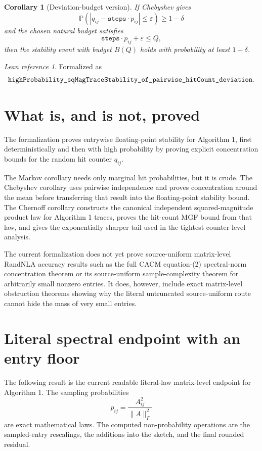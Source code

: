 \documentclass[11pt]{article}
\newcommand{\Prob}{\mathbb{P}}
\newcommand{\lean}[1]{\texttt{\detokenize{#1}}}
\newtheorem{corollary}[theorem]{Corollary}
\theoremstyle{definition}
\theoremstyle{remark}
\newtheorem*{leanref}{Lean reference}
\begin{document}
\begin{corollary}[Deviation-budget version]
If Chebyshev gives
\[
  \Prob\left(
    \left|q_{ij}-\texttt{steps}\cdot p_{ij}\right| \le \varepsilon
  \right)
  \ge 1-\delta
\]
and the chosen natural budget satisfies
\[
  \texttt{steps}\cdot p_{ij}+\varepsilon \le Q,
\]
then the stability event with budget \(B(Q)\) holds with probability at least
\(1-\delta\).
\end{corollary}

\begin{leanref}
Formalized as
\[
  \lean{highProbability_sqMagTraceStability_of_pairwise_hitCount_deviation}.
\]
\end{leanref}

\section*{What is, and is not, proved}

The formalization proves entrywise floating-point stability for Algorithm 1,
first deterministically and then with high probability by proving explicit
concentration bounds for the random hit counter \(q_{ij}\).

The Markov corollary needs only marginal hit probabilities, but it is crude.
The Chebyshev corollary uses pairwise independence and proves concentration
around the mean before transferring that result into the floating-point
stability bound. The Chernoff corollary constructs the canonical independent
squared-magnitude product law for Algorithm 1 traces, proves the hit-count MGF
bound from that law, and gives the exponentially sharper tail used in the
tightest counter-level analysis.

The current formalization does not yet prove source-uniform matrix-level
RandNLA accuracy results such as the full CACM equation-(2) spectral-norm
concentration theorem or its source-uniform sample-complexity theorem for
arbitrarily small nonzero entries.  It does, however, include exact
matrix-level obstruction theorems showing why the literal untruncated
source-uniform route cannot hide the mass of very small entries.

\section*{Literal spectral endpoint with an entry floor}

The following result is the current readable literal-law matrix-level endpoint
for Algorithm 1.  The sampling probabilities
\[
  p_{ij}=\frac{A_{ij}^2}{\|A\|_F^2}
\]
are exact mathematical laws.  The computed non-probability operations are the
sampled-entry rescalings, the additions into the sketch, and the final rounded
residual.
\end{document}

